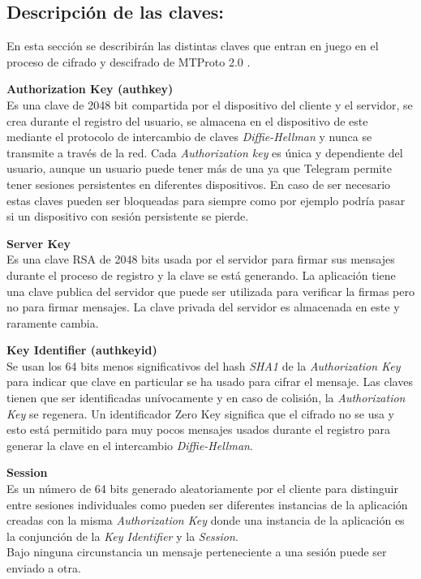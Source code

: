 \subsection{Descripción de las claves:}
En esta sección se describirán las distintas claves que entran en juego en el proceso de cifrado y descifrado de MTProto 2.0 \cite{telegram2}.

\begin{description}
	\item \textbf{Authorization Key (auth\textunderscore key)}\\
	Es una clave de 2048 bit compartida por el dispositivo del cliente y el servidor, se crea durante el registro del usuario, se almacena en el dispositivo de este mediante el protocolo de intercambio de claves \emph{Diffie-Hellman} y nunca se transmite a través de la red. Cada \emph{Authorization key} es única y dependiente del usuario, aunque un usuario puede tener más de una ya que Telegram permite tener sesiones persistentes en diferentes dispositivos. En caso de ser necesario estas claves pueden ser bloqueadas para siempre como por ejemplo podría pasar si un dispositivo con sesión persistente se pierde.

	\item \textbf{Server Key}\\
	Es una clave RSA de 2048 bits usada por el servidor para firmar sus mensajes durante el proceso de registro y la clave se está generando. La aplicación tiene una clave publica del servidor que puede ser utilizada para verificar la firmas pero no para firmar mensajes. La clave privada del servidor es almacenada en este y raramente cambia.

	\item \textbf{Key Identifier (auth\textunderscore key\textunderscore id)}\\
	Se usan los 64 bits menos significativos del hash \emph{SHA1} de la \emph{Authorization Key} para indicar que clave en particular se ha usado para cifrar el mensaje. Las claves tienen que ser identificadas unívocamente y en caso de colisión, la \emph{Authorization Key} se regenera. Un identificador Zero Key significa que el cifrado no se usa y esto está permitido para muy pocos mensajes usados durante el registro para generar la clave en el intercambio \emph{Diffie-Hellman}.
	
	\item \textbf{Session}\\
	Es un número de 64 bits generado aleatoriamente por el cliente para distinguir entre sesiones individuales como pueden ser diferentes instancias de la aplicación creadas con la misma \emph{Authorization Key} donde una instancia de la aplicación es la conjunción de la \emph{Key Identifier} y la \emph{Session}.\\
	Bajo ninguna circunstancia un mensaje perteneciente a una sesión puede ser enviado a otra.


\end{description}
